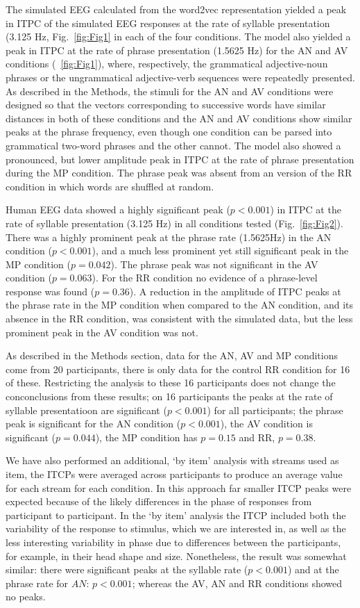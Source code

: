 \documentclass[11pt,a4wide]{article}
\begin{document}
The simulated EEG calculated from the word2vec representation yielded
a peak in ITPC of the simulated EEG responses at the rate of syllable
presentation (3.125 Hz, Fig.~\ref{fig:Fig1} in each of the four
conditions. The model also yielded a peak in ITPC at the rate of
phrase presentation (1.5625 Hz) for the AN and AV conditions
(~\ref{fig:Fig1}), where, respectively, the grammatical adjective-noun
phrases or the ungrammatical adjective-verb sequences were repeatedly
presented. As described in the Methods, the stimuli for the AN and AV
conditions were designed so that the vectors corresponding to
successive words have similar distances in both of these conditions
and the AN and AV conditions show similar peaks at the phrase
frequency, even though one condition can be parsed into grammatical
two-word phrases and the other cannot. The model also showed a
pronounced, but lower amplitude peak in ITPC at the rate of phrase
presentation during the MP condition. The phrase peak was absent from
an version of the RR condition in which words are shuffled at random.

Human EEG data showed a highly significant peak ($p<0.001$) in ITPC
at the rate of syllable presentation (3.125 Hz) in all conditions
tested (Fig.~\ref{fig:Fig2}). There was a highly prominent peak at the
phrase rate (1.5625Hz) in the AN condition ($p<0.001$), and a much
less prominent yet still significant peak in the MP condition
($p=0.042$). The phrase peak was not significant in the AV
condition ($p=0.063$). For the RR condition no evidence of a
phrase-level response was found ($p=0.36$). A reduction in the
amplitude of ITPC peaks at the phrase rate in the MP condition when
compared to the AN condition, and its absence in the RR condition, was
consistent with the simulated data, but the less prominent peak in the
AV condition was not.

As described in the Methods section, data for the AN, AV and MP
conditions come from 20 participants, there is only data for the
control RR condition for 16 of these. Restricting the analysis to
these 16 participants does not change the conconclusions from these
results; on 16 participants the peaks at the rate of syllable
presentatioon are significant ($p<0.001$) for all participants; the
phrase peak is significant for the AN condition ($p<0.001$), the AV
condition is significant ($p=0.044$), the MP condition has $p=0.15$
and RR, $p=0.38$.

We have also performed an additional, `by item' analysis with streams
used as item, the ITCPs were averaged across participants to produce
an average value for each stream for each condition. In this approach
far smaller ITCP peaks were expected because of the likely differences
in the phase of responses from participant to participant. In the `by
item' analysis the ITCP included both the variability of the response
to stimulus, which we are interested in, as well as the less
interesting variability in phase due to differences between the
participants, for example, in their head shape and size. Nonetheless,
the result was somewhat similar: there were significant peaks at the
syllable rate ($p<0.001$) and at the phrase rate for $AN$:
$p<0.001$; whereas the AV, AN and RR conditions showed no
peaks.
\end{document}
